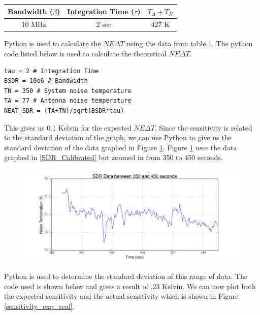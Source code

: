 {\begin{table}[h!tb] \centering
{}
\label{exp2_param}
\begin{tabular}{ccc} \hline
\textbf{Bandwidth ($\beta$)} & \textbf{Integration Time ($\tau$)} & \textbf{$T_{A}+T_{N}$}\\ \hline
10 MHz & 2 sec & 427 K \\ \hline
\end{tabular}
\end{table}

Python is used to calculate the $NE\Delta T$ using the data from table \ref{exp2_param}.  The python code listed below is used to calculate the theoretical $NE\Delta T$.

\begin{lstlisting}[frame=single,keywordstyle=\color{blue}]
tau = 2 # Integration Time
BSDR = 10e6 # Bandwidth
TN = 350 # System noise temperature
TA = 77 # Antenna noise temperature
NEAT_SDR = (TA+TN)/sqrt(BSDR*tau)
\end{lstlisting}

This gives us 0.1 Kelvin for the expected $NE\Delta T$.  Since the sensitivity is related to the standard deviation of the graph, we can use Python to give us the standard deviation of the data graphed in Figure \ref{Sensitivity_graph}.  Figure \ref{Sensitivity_graph} uses the data graphed in \ref{SDR_Calibrated} but zoomed in from 350 to 450 seconds. 

\begin{figure}[h!tb] \centering
\includegraphics[width=\textwidth]{Experiments/Exp1/SDR_Zoom.pdf}
\label{Sensitivity_graph}
\end{figure}

Python is used to determine the standard deviation of this range of data.  The code used is shown below and gives a result of .23 Kelvin.  We can now plot both the expected sensitivity and the actual sensitivity which is shown in Figure \ref{sensitivity_exp_real}.

}

